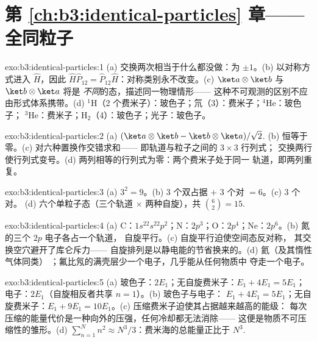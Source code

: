 \section*{第 \ref{ch:b3:identical-particles} 章——全同粒子}

\begin{solution}{exo:b3:identical-particles:1}
(a) 交换两次相当于什么都没做：为 $\pm1$。(b)
以对称方式进入 $\hat H$，因此 $\hat H\hat
P_{12} = \hat P_{12}\hat H$：对称类别永不改变。(c)
$\ket a\otimes\ket b$ 与 $\ket b\otimes\ket a$ 将是
\emph{不同}的态，描述同一物理情形——
这种不可观测的区别不应由形式体系携带。(d)
$^1$H（2 个费米子）：玻色子；氘（3）：费米子；$^4$He：玻色子；
$^3$He：费米子；H$_2$（4）：玻色子；光子：玻色子。
\end{solution}

\begin{solution}{exo:b3:identical-particles:2}
(a) $(\ket a\otimes\ket b - \ket b\otimes\ket a)/\sqrt2$. (b)
恒等于零。(c) 对六种置换作交错求和——
即轨道与粒子之间的 $3\times3$ 行列式；
交换两行使行列式变号。(d)
两列相等的行列式为零：两个费米子处于同一
轨道，即两列重复。
\end{solution}

\begin{solution}{exo:b3:identical-particles:3}
(a) $3^2 = 9$。(b) $3$ 个双占据 $+$ $3$ 个对 $= 6$。(c) $3$ 个对。
(d) 六个单粒子态（三个轨道 $\times$ 两种自旋），共
$\binom62 = 15$.
\end{solution}

\begin{solution}{exo:b3:identical-particles:4}
(a) C：$1s^22s^22p^2$；N：$2p^3$；O：$2p^4$；Ne：$2p^6$。(b)
氮的三个 $2p$ 电子各占一个轨道，
自旋平行。(c) 自旋平行迫使空间态反对称，
其交换空穴避开了库仑斥力——
自旋排列是以静电能的节省换来的。(d) 氦（及其惰性气体同类）
；氟比氖的满壳层少一个电子，几乎能从任何物质中
夺走一个电子。
\end{solution}

\begin{solution}{exo:b3:identical-particles:5}
(a) 玻色子：$2E_1$；无自旋费米子：$E_1 + 4E_1 = 5E_1$；
电子：$2E_1$（自旋相反者共享 $n = 1$）。(b) 玻色子与电子：
$E_1 + 4E_1 = 5E_1$；无自旋费米子：$E_1 + 9E_1 =
10E_1$。(c) 压缩费米子迫使其占据越来越高的能级：
每次压缩的能量代价是一种向外的压强，任何冷却都无法消除——
这便是物质不可压缩性的雏形。(d)
$\sum_{n=1}^N n^2 \approx N^3/3$：费米海的总能量正比于
$N^3$.
\end{solution}

